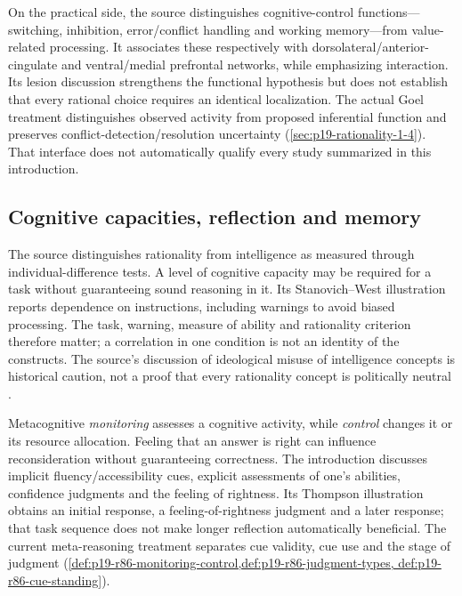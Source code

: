 On the practical side, the source distinguishes cognitive-control
functions---switching, inhibition, error/conflict handling and working
memory---from value-related processing. It associates these respectively
with dorsolateral/anterior-cingulate and ventral/medial prefrontal
networks, while emphasizing interaction. Its lesion discussion
strengthens the functional hypothesis but does not establish that
every rational choice requires an identical localization. The actual
Goel treatment distinguishes observed activity from proposed inferential
function and preserves conflict-detection/resolution uncertainty
(\cref{sec:p19-rationality-1-4}). That interface does not automatically
qualify every study summarized in this introduction.

\subsection{Cognitive capacities, reflection and memory}

The source distinguishes rationality from intelligence as measured
through individual-difference tests. A level of cognitive capacity may
be required for a task without guaranteeing sound reasoning in it.
Its Stanovich--West illustration reports dependence on instructions,
including warnings to avoid biased processing. The task, warning,
measure of ability and rationality criterion therefore matter; a
correlation in one condition is not an identity of the constructs.
The source's discussion of ideological misuse of intelligence concepts
is historical caution, not a proof that every rationality concept is
politically neutral \cite[pp.~37--39]{KnauffSpohn2021FrameworksIntro}.

Metacognitive \emph{monitoring} assesses a cognitive activity, while
\emph{control} changes it or its resource allocation. Feeling that an
answer is right can influence reconsideration without guaranteeing
correctness. The introduction discusses implicit fluency/accessibility
cues, explicit assessments of one's abilities, confidence judgments
and the feeling of rightness. Its Thompson illustration obtains an
initial response, a feeling-of-rightness judgment and a later response;
that task sequence does not make longer reflection automatically
beneficial. The current meta-reasoning treatment separates cue validity,
cue use and the stage of judgment
(\cref{def:p19-r86-monitoring-control,def:p19-r86-judgment-types,
def:p19-r86-cue-standing}).

